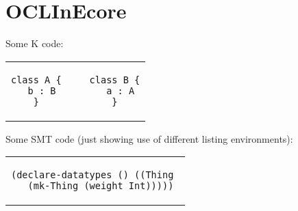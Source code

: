 
\section{OCLInEcore}
\label{sec:oclinecore}

Some K code:

\lstset{language=K,numbers=none}

\begin{center}
\begin{tabular}{c}
\small
\begin{lstlisting}
class A {     class B {
  b : B         a : A
}             }
\end{lstlisting}
\end{tabular}
\end{center}

Some SMT code (just showing use of different listing environments):


\lstset{language=SMT,numbers=none}

\begin{center}
\begin{tabular}{c}
\small
\begin{lstlisting}
(declare-datatypes () ((Thing 
  (mk-Thing (weight Int)))))
\end{lstlisting}
\end{tabular}
\end{center}









